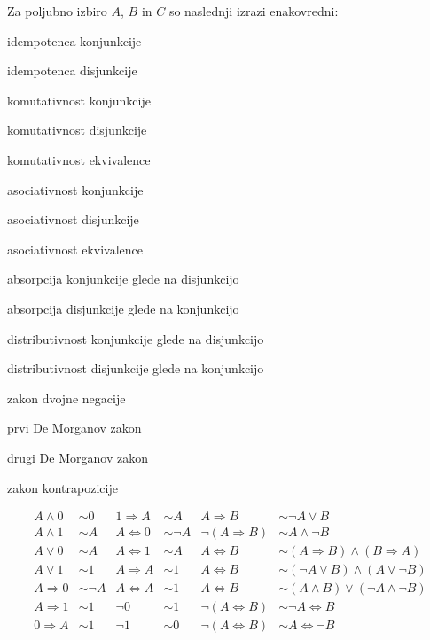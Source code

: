 \documentclass[12pt, a4paper]{article}
\renewcommand{\implies}{\Rightarrow}
\renewcommand{\iff}{\Leftrightarrow}
\begin{document}
\begin{zgled}
Za poljubno izbiro $A$, $B$ in $C$ so naslednji izrazi enakovredni:

\begin{description}[align=left, labelwidth=\widthof{$A\lor(B\land C)\sim (A\lor B)\land(A\lor C)AA$}]
\item[$A\land 1\sim A$] idempotenca konjunkcije
\item[$A\lor A\sim A$] idempotenca disjunkcije
\item[$A\land B\sim B\land A$] komutativnost konjunkcije
\item[$A\lor B\sim B\lor A$] komutativnost disjunkcije
\item[$A\iff B\sim B\iff A$] komutativnost ekvivalence
\item[$A\land(B\land C)\sim(A\land B)\land C$] asociativnost konjunkcije
\item[$A\lor(B\lor C)\sim(A\lor B)\lor C$] asociativnost disjunkcije
\item[$A\iff(B\iff C)\sim(A\iff B)\iff C$] asociativnost ekvivalence
\item[$A\land(A\lor B)\sim A$] absorpcija konjunkcije glede na disjunkcijo
\item[$A\lor(A\land B)\sim A$] absorpcija disjunkcije glede na konjunkcijo
\item[$A\land(B\lor C)\sim (A\land B)\lor(A\land C)$] distributivnost konjunkcije glede na disjunkcijo
\item[$A\lor(B\land C)\sim (A\lor B)\land(A\lor C)$] distributivnost disjunkcije glede na konjunkcijo
\item[$\neg\neg A\sim A$] zakon dvojne negacije
\item[$\neg(A\land B)\sim \neg A\lor\neg B$] prvi De Morganov zakon
\item[$\neg(A\lor B)\sim \neg A\land\neg B$] drugi De Morganov zakon
\item[$A\implies B\sim\neg B\implies\neg A$] zakon kontrapozicije
\end{description}
\begin{align*}
A\land 0   &\sim 0     & 1\implies A&\sim A     & A\implies B      &\sim\neg A\lor B                      \\
A\land 1   &\sim A     & A\iff 0    &\sim\neg A & \neg(A\implies B)&\sim A\land\neg B                     \\
A\lor 0    &\sim A     & A\iff 1    &\sim A     & A\iff B          &\sim (A\implies B)\land(B\implies A)  \\
A\lor 1    &\sim 1     & A\implies A&\sim 1     & A\iff B          &\sim (\neg A\lor B)\land(A\lor\neg B) \\
A\implies 0&\sim\neg A & A\iff A    &\sim 1     & A\iff B          &\sim (A\land B)\lor(\neg A\land\neg B)\\
A\implies 1&\sim 1     & \neg 0     &\sim 1     & \neg(A\iff B)    &\sim\neg A\iff B                      \\
0\implies A&\sim 1     & \neg 1     &\sim 0     & \neg(A\iff B)    &\sim A\iff\neg B             
\end{align*}
\end{zgled}
\end{document}
